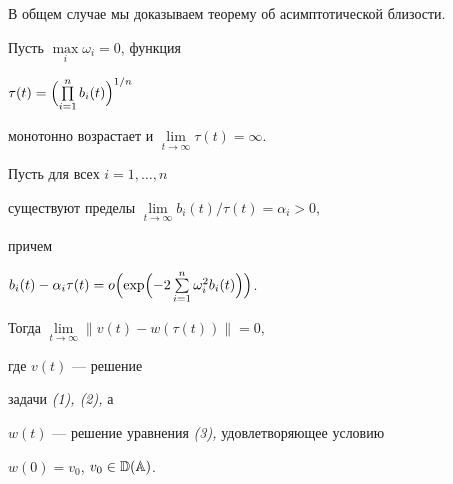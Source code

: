  


В общем случае мы доказываем теорему об асимптотической близости. 


 


\begin{thm} Пусть $\max\limits_i\omega_i=0$, функция 


$\tau(t)=\Bigl(\prod\limits^n_{i=1}b_i(t)\Bigr)^{1/n}$ 


монотонно возрастает и $\lim\limits_{t\to\infty}\tau(t)=\infty$. 


Пусть для всех $i=1,\dotsc,n$ 


существуют пределы $\lim\limits_{t\to\infty}b_i(t)/\tau(t)=\alpha_i>0$, 


причем 


$b_i(t)-\alpha_i\tau(t)=o\Bigl(\exp\Bigl(-2\sum\limits^n_{i=1} 


\omega^2_ib_i(t)\Bigr)\Bigr)$. 


Тогда $\lim\limits_{t\to\infty}\|v(t)-w(\tau(t))\|=0$, 


где $v(t)$ --- решение 


задачи {\em (1), (2),} а 


$w(t)$ --- решение уравнения {\em (3),} удовлетворяющее условию 


$w(0)=v_0$, $v_0\in\Bbb D(\Bbb A)$. 


\end{thm} 


 


